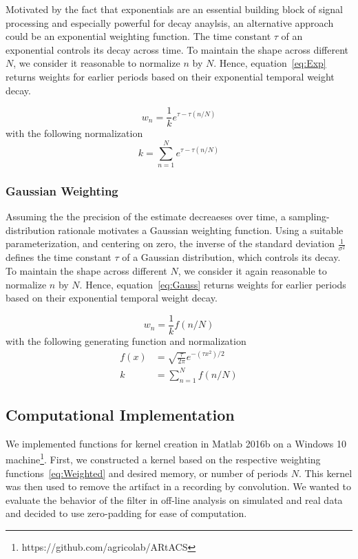 \documentclass[a4paper]{article}
\begin{document}
Motivated by the fact that exponentials are an essential building block of signal processing and especially powerful for decay anaylsis, an alternative approach could be an exponential weighting function. The time constant $\tau$ of an exponential controls its decay across time. To maintain the shape across different $N$, we consider it reasonable to normalize $n$ by $N$. Hence, equation~\eqref{eq:Exp} returns weights for earlier periods based on their exponential temporal weight decay.

\begin{equation}
    w_n = \frac{1}{k} e^{\tau-\tau{(n/N)}}\label{eq:Exp}
\end{equation}
with the following normalization
\begin{equation}
    k  = \sum_{n=1}^{N} e^{\tau-\tau{(n/N)}}\label{eq:NormExp}
\end{equation}


\subsubsection{Gaussian Weighting}

Assuming the the precision of the estimate decreaeses over time, a sampling-distribution rationale motivates a Gaussian weighting function. Using a suitable parameterization, and centering on zero, the inverse of the standard deviation $\frac{1}{\sigma^2}$ defines the time constant $\tau$ of a Gaussian distribution, which controls its decay.
To maintain the shape across different $N$, we consider it again reasonable to normalize $n$ by $N$. Hence, equation~\eqref{eq:Gauss} returns weights for earlier periods based on their exponential temporal weight decay.

\begin{equation}
    w_n = \frac{1}{k} f(n/N)\label{eq:Gauss}
\end{equation}
with the following generating function and normalization
\begin{align}
    f(x)  & = \sqrt{\frac{\tau}{2\pi}} e^{-(\tau x^2)/2}  \\
    k  & = \sum_{n=1}^{N} f(n/N)\label{eq:NormGauss}
\end{align}

\subsection{Computational Implementation}

We implemented functions for kernel creation in Matlab 2016b on a Windows 10 machine\footnote{https://github.com/agricolab/ARtACS}. First, we constructed a kernel based on the respective weighting functions~\eqref{eq:Weighted} and desired memory, or number of periods $N$. This kernel was then used to remove the artifact in a recording by convolution.
We wanted to evaluate the behavior of the filter in off-line analysis on simulated and real data and decided to use zero-padding for ease of computation.
\end{document}
